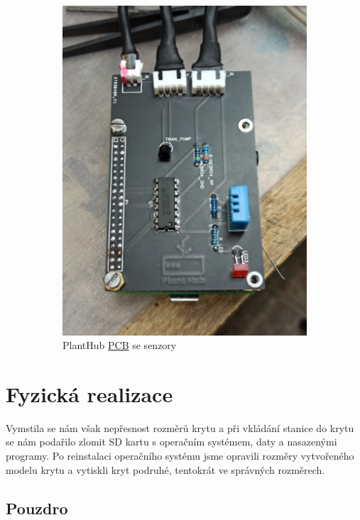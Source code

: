 \documentclass[12pt,a4paper]{article}
\begin{document}
\begin{figure}[h]
	\begin{subfigure}[b]{0.4\linewidth}
		\includegraphics[width=\linewidth]{planthub.png}
		\caption{PlantHub \underline{\ac{PCB}} se senzory}
	\end{subfigure}
	\caption{}
\end{figure}

\clearpage

\section{Fyzická realizace}

Vymstila se nám však nepřesnost rozměrů krytu a při vkládání stanice do krytu se nám podařilo zlomit SD kartu s operačním systémem, daty a nasazenými programy. Po reinstalaci operačního systému jsme opravili rozměry vytvořeného modelu krytu a vytiskli kryt podruhé, tentokrát ve správných rozměrech.

\subsection{Pouzdro}
\end{document}
